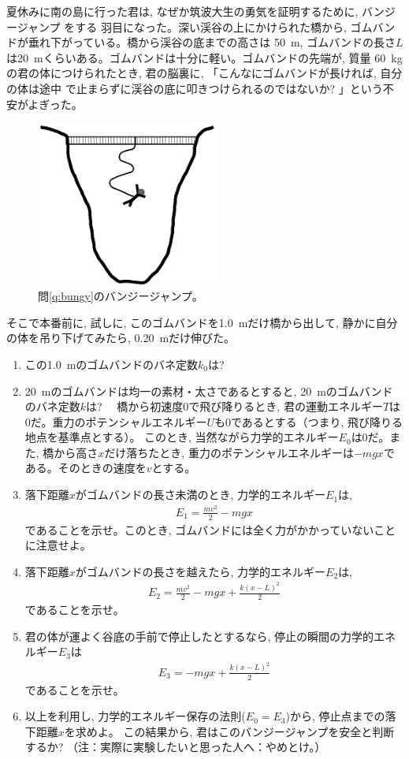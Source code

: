 %
\begin{q}\label{q:bungy}
夏休みに南の島に行った君は, なぜか筑波大生の勇気を証明するために, バンジージャンプ
をする
羽目になった。深い渓谷の上にかけられた橋から, ゴムバンドが垂れ下がっている。橋から渓谷の底までの高さは
50~m, ゴムバンドの長さ$L$は20~mくらいある。ゴムバンドは十分に軽い。ゴムバンドの先端が, 質量
60~kgの君の体につけられたとき, 君の脳裏に, 「こんなにゴムバンドが長ければ, 自分の体は途中
で止まらずに渓谷の底に叩きつけられるのではないか? 」という不安がよぎった。
\begin{figure}[h]
    \centering
    \includegraphics[width=6.0cm]{bangy.eps}
    \caption{問\ref{q:bungy}のバンジージャンプ。}\label{fig:bangy}
\end{figure}

そこで本番前に, 試しに, このゴムバンドを1.0~mだけ橋から出して, 静かに自分の体を吊り下げてみたら, 0.20~mだけ伸びた。
\begin{enumerate}
\item この1.0~mのゴムバンドのバネ定数$k_0$は?
\item 20~mのゴムバンドは均一の素材・太さであるとすると, 20~mのゴムバンドのバネ定数$k$は?
　橋から初速度0で飛び降りるとき, 君の運動エネルギー$T$は0だ。重力のポテンシャルエネルギー$U$も0であるとする（つまり, 
飛び降りる地点を基準点とする）。
このとき, 当然ながら力学的エネルギー$E_0$は0だ。また, 橋から高さ$x$だけ落ちたとき, 
重力のポテンシャルエネルギーは$-mgx$である。そのときの速度を$v$とする。
\item 落下距離$x$がゴムバンドの長さ未満のとき, 力学的エネルギー$E_1$は, 
\begin{eqnarray} 
E_1=\frac{mv^2}{2}-mgx
\end{eqnarray} 
であることを示せ。このとき, ゴムバンドには全く力がかかっていないことに注意せよ。
\item 落下距離$x$がゴムバンドの長さを越えたら, 力学的エネルギー$E_2$は, 
\begin{eqnarray} 
E_2=\frac{mv^2}{2}-mgx+\frac{k(x-L)^2}{2}
\end{eqnarray} 
であることを示せ。
\item 君の体が運よく谷底の手前で停止したとするなら, 停止の瞬間の力学的エネルギー$E_3$は
\begin{eqnarray} 
E_3=-mgx+\frac{k(x-L)^2}{2}
\end{eqnarray} 
であることを示せ。
\item 以上を利用し, 力学的エネルギー保存の法則($E_0=E_3$)から, 停止点までの落下距離$x$を求めよ。
この結果から, 君はこのバンジージャンプを安全と判断するか? （注：実際に実験したいと思った人へ：やめとけ。）
\end{enumerate}
\end{q}
